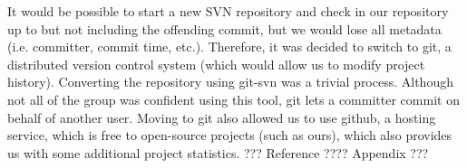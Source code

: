 It would be possible to start a new SVN repository and check in our 
repository up to but not including the offending commit, but we would lose 
all metadata (i.e. committer, commit time, etc.). Therefore, it was decided to 
switch to git, a distributed version control system (which would allow us to 
modify project history). Converting the repository using git-svn was a trivial 
process. Although not all of the group was confident using this tool, git 
lets a committer commit on behalf of another user. Moving to git also 
allowed us to use github, a hosting service, which is free to open-source 
projects (such as ours), which also provides us with some additional 
project statistics. ??? Reference ???? Appendix ???
